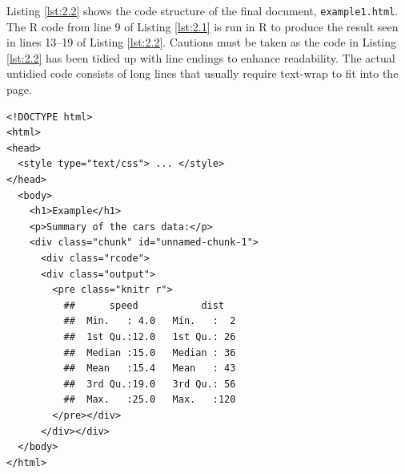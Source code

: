 \documentclass[a4paper, 12pt]{report}
\begin{document}
Listing \ref{lst:2.2} shows the code structure of the final document, \texttt{example1.html}. The R code from line 9 of Listing \ref{lst:2.1} is run in R to produce the result seen in lines 13--19 of Listing \ref{lst:2.2}. Cautions must be taken as the code in Listing \ref{lst:2.2} has been tidied up with line endings to enhance readability. The actual untidied code consists of long lines that usually require text-wrap to fit into the page.
\begin{lstlisting}[caption={(tidied) \texttt{example1.html}}, escapechar=\|, label={lst:2.2}]
<!DOCTYPE html>
<html>
<head>
  <style type="text/css"> ... </style>
</head>
  <body>
    <h1>Example</h1>
    <p>Summary of the cars data:</p>
    <div class="chunk" id="unnamed-chunk-1">
      <div class="rcode">
      <div class="output">
        <pre class="knitr r">
          ##      speed           dist    
          ##  Min.   : 4.0   Min.   :  2  
          ##  1st Qu.:12.0   1st Qu.: 26  
          ##  Median :15.0   Median : 36  
          ##  Mean   :15.4   Mean   : 43  
          ##  3rd Qu.:19.0   3rd Qu.: 56  
          ##  Max.   :25.0   Max.   :120
        </pre></div>
      </div></div>
  </body>
</html>
\end{lstlisting}
\end{document}

